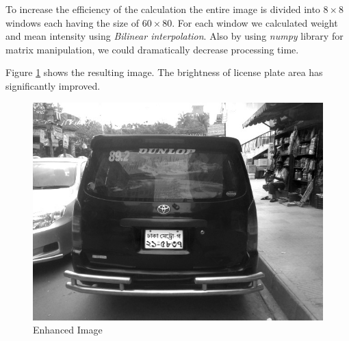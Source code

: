 \documentclass{standalone}
\begin{document}
To increase the efficiency of the calculation the entire image is divided into $8 \times 8$ windows each having the size of $60 \times 80$. For each window we calculated weight and mean intensity using {\it Bilinear interpolation}. Also by using {\it numpy} library for matrix manipulation, we could dramatically decrease processing time.

Figure \ref{fig:EnhanceSample} shows the resulting image. The brightness of license plate area has significantly improved.
\begin{figure}
	\centering
	\includegraphics[width=.8\linewidth]{./img/sample/stage4.jpg}
	\caption{Enhanced Image} 
	\label{fig:EnhanceSample}
\end{figure}
\end{document}
